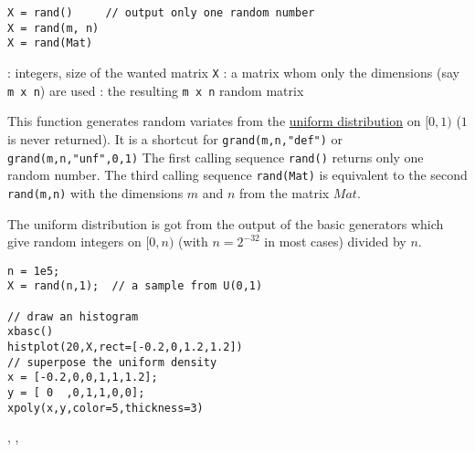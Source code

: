 \begin{mandesc}
  \short{rand}{generates random variates from the uniform distribution on [0,1)}
\end{mandesc}
\begin{calling_sequence}
\begin{verbatim}
X = rand()     // output only one random number 
X = rand(m, n)
X = rand(Mat)
\end{verbatim}
\end{calling_sequence}
\begin{parameters}
  \begin{varlist}
    : integers, size of the wanted matrix \verb!X!
   : a matrix whom only the dimensions (say \verb!m x n!) are used
   : the resulting \verb!m x n! random matrix
  \end{varlist}
  \end{parameters}
  
\begin{mandescription}
  This function generates random variates from the  \hyperlink{unfpdf}{uniform distribution} on $[0,1)$
 ($1$ is never returned). It is a shortcut for \verb+grand(m,n,"def")+ or
\verb+grand(m,n,"unf",0,1)+
  The first calling sequence \verb+rand()+ returns only one random number. The
 third calling sequence \verb+rand(Mat)+ is equivalent to the second  
 \verb+rand(m,n)+ with the dimensions $m$ and $n$ from the matrix $Mat$.

  The uniform distribution is got from the output of the basic generators which
 give random integers on $[0,n)$ (with $n = 2^{-32}$ in most cases) divided by $n$.
 
\end{mandescription}

\begin{examples}
\begin{Verbatim}
n = 1e5;
X = rand(n,1);  // a sample from U(0,1)

// draw an histogram
xbasc()
histplot(20,X,rect=[-0.2,0,1.2,1.2])
// superpose the uniform density
x = [-0.2,0,0,1,1,1.2];
y = [ 0  ,0,1,1,0,0];
xpoly(x,y,color=5,thickness=3)
\end{Verbatim}
\end{examples}

\begin{manseealso}
  , ,    
\end{manseealso}



